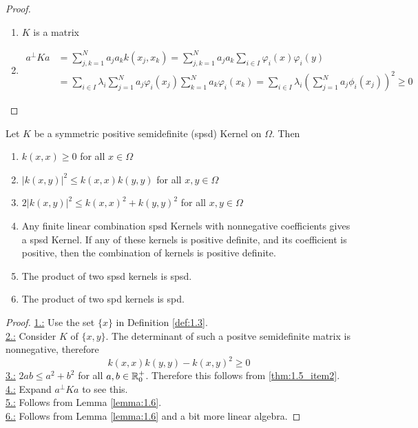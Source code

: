 \begin{proof}
    \begin{enumerate}
        \item $K$ is a  matrix
        \item \begin{align*}
            a^\perp K a&=\sum_{j,k=1}^N a_ja_k k(x_j,x_k)=\sum_{j,k=1}^Na_ja_k\sum_{i\in I}\varphi_i(x)\varphi_i(y)\\
            &=\sum_{i\in I}\lambda_i\sum_{j=1}^N a_j\varphi_i(x_j)\sum_{k=1}^N a_k\varphi_i(x_k)=\sum_{i\in I}\lambda_i\left(\sum_{j=1}^N a_j\phi_i(x_j)\right)^2\geq 0
        \end{align*}
    \end{enumerate}
\end{proof}

\begin{theorem}\label{thm:1.5}
    Let $K$ be a symmetric positive semidefinite (spsd) Kernel on $\Omega$. Then  
    \begin{enumerate}
        \item $k(x,x)\geq 0$ for all $x\in \Omega$
        \item\label{thm:1.5_item2} $\vert k(x,y)\vert^2\leq k(x,x)k(y,y)$ for all $x,y\in\Omega$
        \item $2\vert k(x,y)\vert^2\leq k(x,x)^2+k(y,y)^2$ for all $x,y\in\Omega$
        \item Any finite linear combination spsd Kernels with nonnegative coefficients gives a spsd Kernel. If any of these kernels is positive definite, and its coefficient is positive, then the combination of kernels is positive definite.
        \item The product of two spsd kernels is spsd.
        \item The product of two spd kernels is spd.
    \end{enumerate}
\end{theorem}

\begin{proof}
    \underline{1.:} Use the set $\{x\}$ in Definition \ref{def:1.3}.\\
    \underline{2.:} Consider $K$ of $\{x,y\}$. 
    The determinant of such a positve semidefinite matrix is nonnegative,
    therefore \[k(x,x)k(y,y)-k(x,y)^2\geq 0\]
    \underline{3.:} $2ab\leq a^2+b^2$ for all $a,b\in\mathbb{R}_0^+$. Therefore this follows from \ref{thm:1.5_item2}.\\
    \underline{4.:} Expand $a^\perp K a$ to see this.\\
    \underline{5.:} Follows from Lemma \ref{lemma:1.6}.\\
    \underline{6.:} Follows from Lemma \ref{lemma:1.6} and a bit more linear algebra.
\end{proof}

